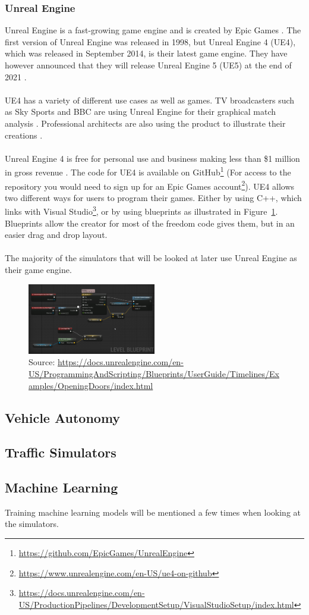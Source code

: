 \subsubsection{Unreal Engine}
Unreal Engine is a fast-growing game engine and is created by Epic Games \cite{UnrealEngine_Book}. The first version of Unreal Engine was released in 1998, but Unreal Engine 4 (UE4), which was released in September 2014, is their latest game engine. They have however announced that they will release Unreal Engine 5 (UE5) at the end of 2021 \cite{UE5}. 
\\~\\
UE4 has a variety of different use cases as well as games. TV broadcasters such as Sky Sports and BBC are using Unreal Engine for their graphical match analysis \cite{UnrealEngine_LiveBroadcast}. Professional architects are also using the product to illustrate their creations \cite{UnrealEngine_Automative}.   
\\~\\
Unreal Engine 4 is free for personal use and business making less than \$1 million in gross revenue \cite{UE5}. The code for UE4 is available on GitHub\footnote{\url{https://github.com/EpicGames/UnrealEngine}} (For access to the repository you would need to sign up for an Epic Games account\footnote{\url{https://www.unrealengine.com/en-US/ue4-on-github}}). UE4 allows two different ways for users to program their games. Either by using C++, which links with Visual Studio\footnote{\url{https://docs.unrealengine.com/en-US/ProductionPipelines/DevelopmentSetup/VisualStudioSetup/index.html}}, or by using blueprints as illustrated in Figure~\ref{UnrealEngineBlueprint}. Blueprints allow the creator for most of the freedom code gives them, but in an easier drag and drop layout.
\\~\\
The majority of the simulators that will be looked at later use Unreal Engine as their game engine. 

\begin{figure}[H] 
    \centering
    \includegraphics[width=0.5\textwidth]{OtherImages/UEBlueprint.png}
    \caption{Source: \url{https://docs.unrealengine.com/en-US/ProgrammingAndScripting/Blueprints/UserGuide/Timelines/Examples/OpeningDoors/index.html}}    \label{UnrealEngineBlueprint}

\end{figure}

\subsection{Vehicle Autonomy}
\subsection{Traffic Simulators}


\subsection{Machine Learning}
Training machine learning models will be mentioned a few times when looking at the simulators.